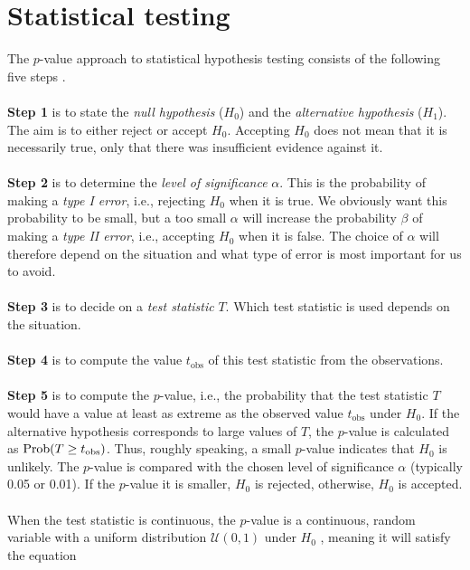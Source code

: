 \chapter{Statistical testing\label{ch:statistical}}

\graphicspath{{figs/statistical/}}

The $p$-value approach to statistical hypothesis testing consists of the following five steps . 
\\ \\{\bf Step 1} is to state the \emph{null hypothesis} ($H_0$) and the \emph{alternative hypothesis} ($H_1$). The aim is to either reject or accept $H_0$. Accepting $H_0$ does not mean that it is necessarily true, only that there was insufficient evidence against it.
\\ \\{\bf Step 2} is to determine the \emph{level of significance} $\alpha\label{eq:alpha}$. This is the probability of making a \emph{type I error}, i.e., rejecting $H_0$ when it is true. We obviously want this probability to be small, but a too small $\alpha$ will increase the probability $\beta\label{eq:beta}$ of making a \emph{type II error}, i.e., accepting $H_0$ when it is false. The choice of $\alpha$ will therefore depend on the situation and what type of error is most important for us to avoid. 
\\ \\{\bf Step 3} is to decide on a \emph{test statistic} $T$. Which test statistic is used depends on the situation. 
\\ \\{\bf Step 4} is to compute the value $t_\text{obs}$ of this test statistic from the observations.
\\ \\{\bf Step 5} is to compute the $p$-value, i.e., the probability that the test statistic $T$ would have a value at least as extreme as the observed value $t_\text{obs}$ under $H_0$. If the alternative hypothesis corresponds to large values of $T$, the $p$-value is calculated as $\text{Prob}\!\left(T \ge t_\text{obs}\right)$. Thus, roughly speaking, a small $p$-value indicates that $H_0$ is unlikely. The $p$-value is compared with the chosen level of significance $\alpha$ (typically 0.05 or 0.01). If the $p$-value it is smaller, $H_0$ is rejected, otherwise, $H_0$ is accepted.
\\ \\
When the test statistic is continuous, the $p$-value is a continuous, random variable with a uniform distribution $\mathcal{U}(0, 1)\label{eq:uniform}$ under $H_0$ , meaning it will satisfy the equation
